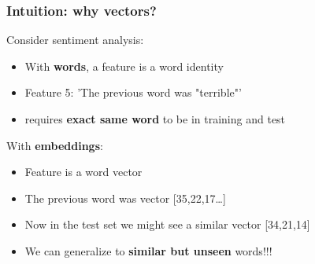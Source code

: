 \documentclass[13.5pt,aspecratio=169, xcolor=dvipsnames]{beamer}
\begin{document}
\begin{frame}
    \onehalfspacing
        \frametitle{Intuition: why vectors?}
        {\large
        \begin{block}{Consider sentiment analysis:}
            \begin{itemize}
                \item With \textbf{words}, a feature is a word identity
                \item Feature 5: 'The previous word was "terrible"'
                \item requires \textbf{exact same word} to be in training and test 
            \end{itemize}
        \end{block}
        \begin{block}{With \textbf{embeddings}:}
            \begin{itemize}
                \item Feature is a word vector
                \item The previous word was vector [35,22,17…]
                \item Now in the test set we might see a similar vector [34,21,14]
                \item We can generalize to \textbf{similar but unseen} words!!! 
            \end{itemize}
        \end{block}


        }
    \end{frame}
\end{document}
